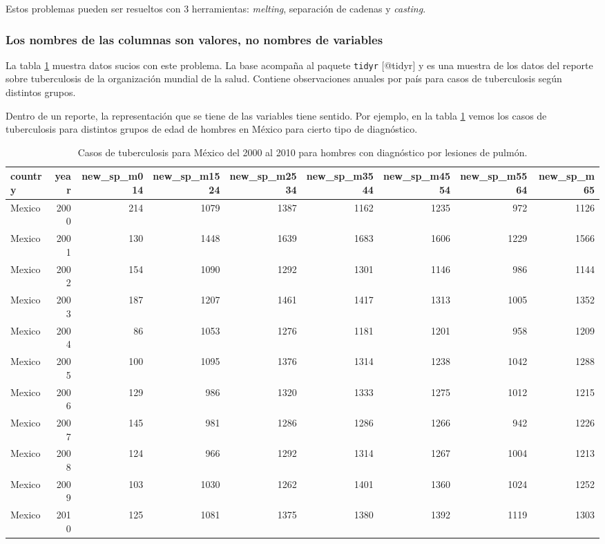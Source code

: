 \documentclass[]{article}
\begin{document}
Estos problemas pueden ser resueltos con 3 herramientas: \emph{melting},
separación de cadenas y \emph{casting}.

\subsubsection{Los nombres de las columnas son valores, no nombres de
variables}\label{los-nombres-de-las-columnas-son-valores-no-nombres-de-variables}

La tabla \ref{tab:varsencols} muestra datos sucios con este problema. La
base acompaña al paquete \texttt{tidyr} {[}@tidyr{]} y es una muestra de
los datos del reporte sobre tuberculosis de la organización mundial de
la salud. Contiene observaciones anuales por país para casos de
tuberculosis según distintos grupos.

Dentro de un reporte, la representación que se tiene de las variables
tiene sentido. Por ejemplo, en la tabla \ref{tab:varsencols} vemos los
casos de tuberculosis para distintos grupos de edad de hombres en México
para cierto tipo de diagnóstico.

\begin{table}[H]
\centering
\begingroup\tiny
\begin{tabular}{lrrrrrrrr}
  \hline
country & year & new\_sp\_m014 & new\_sp\_m1524 & new\_sp\_m2534 & new\_sp\_m3544 & new\_sp\_m4554 & new\_sp\_m5564 & new\_sp\_m65 \\ 
  \hline
Mexico & 2000 & 214 & 1079 & 1387 & 1162 & 1235 & 972 & 1126 \\ 
  Mexico & 2001 & 130 & 1448 & 1639 & 1683 & 1606 & 1229 & 1566 \\ 
  Mexico & 2002 & 154 & 1090 & 1292 & 1301 & 1146 & 986 & 1144 \\ 
  Mexico & 2003 & 187 & 1207 & 1461 & 1417 & 1313 & 1005 & 1352 \\ 
  Mexico & 2004 &  86 & 1053 & 1276 & 1181 & 1201 & 958 & 1209 \\ 
  Mexico & 2005 & 100 & 1095 & 1376 & 1314 & 1238 & 1042 & 1288 \\ 
  Mexico & 2006 & 129 & 986 & 1320 & 1333 & 1275 & 1012 & 1215 \\ 
  Mexico & 2007 & 145 & 981 & 1286 & 1286 & 1266 & 942 & 1226 \\ 
  Mexico & 2008 & 124 & 966 & 1292 & 1314 & 1267 & 1004 & 1213 \\ 
  Mexico & 2009 & 103 & 1030 & 1262 & 1401 & 1360 & 1024 & 1252 \\ 
  Mexico & 2010 & 125 & 1081 & 1375 & 1380 & 1392 & 1119 & 1303 \\ 
   \hline
\end{tabular}
\endgroup
\caption{Casos de tuberculosis para México del 2000 al 2010 para hombres con diagnóstico por lesiones de pulmón.} 
\label{tab:varsencols}
\end{table}
\end{document}
